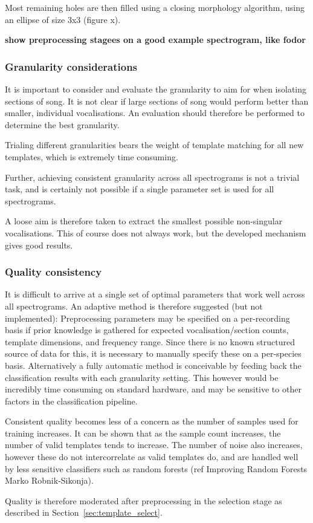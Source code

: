 Most remaining holes are then filled using a closing morphology algorithm,
using an ellipse of size 3x3 (figure x).

\textbf{show preprocessing stagees on a good example spectrogram, like fodor}

\subsubsection{Granularity considerations}
It is important to consider and evaluate the granularity to aim for when
isolating sections of song.
It is not clear if large sections of song would perform better than smaller,
individual vocalisations.
An evaluation should therefore be performed to determine the best granularity.

Trialing different granularities bears the weight of template matching for all
new templates, which is extremely time consuming.

Further, achieving consistent granularity across all spectrograms is not a trivial
task, and is certainly not possible if a single parameter set is used for
all spectrograms.

A loose aim is therefore taken to extract the smallest possible non-singular
vocalisations.
This of course does not always work, but the developed mechanism gives good
results.

\subsubsection{Quality consistency}
It is difficult to arrive at a single set of optimal parameters that work
well across all spectrograms.
An adaptive method is therefore suggested (but not implemented):
Preprocessing parameters may be specified on a per-recording basis if prior
knowledge is gathered for expected vocalisation/section counts, template
dimensions, and frequency range.
Since there is no known structured source of data for this, it is necessary to
manually specify these on a per-species basis.
Alternatively a fully automatic method is conceivable by feeding back the
classification results with each granularity setting.
This however would be incredibly time consuming on standard hardware, and may
be sensitive to other factors in the classification pipeline.

Consistent quality becomes less of a concern as the number of samples used for
training increases.
It can be shown that as the sample count increases, the number of valid templates
tends to increase.
The number of noise also increases, however these do not intercorrelate as valid
templates do, and are handled well by less sensitive classifiers such as
random forests (ref Improving Random Forests Marko Robnik-Sikonja).

Quality is therefore moderated after preprocessing in the selection stage as
described in Section~\ref{sec:template_select}.
